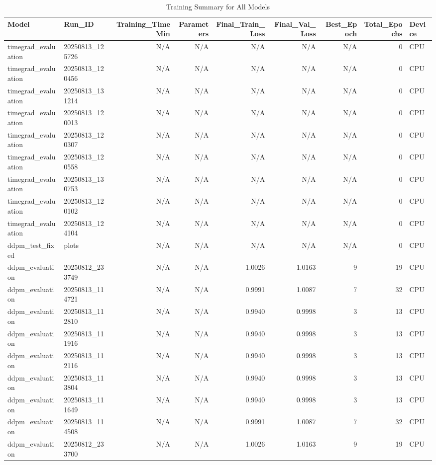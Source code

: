 \begin{table}
\caption{Training Summary for All Models}
\label{tab:training_summary}
\begin{tabular}{l|l|r|r|r|r|r|r|l}
\toprule
Model & Run_ID & Training_Time_Min & Parameters & Final_Train_Loss & Final_Val_Loss & Best_Epoch & Total_Epochs & Device \\
\midrule
timegrad_evaluation & 20250813_125726 & N/A & N/A & N/A & N/A & N/A & 0 & CPU \\
timegrad_evaluation & 20250813_120456 & N/A & N/A & N/A & N/A & N/A & 0 & CPU \\
timegrad_evaluation & 20250813_131214 & N/A & N/A & N/A & N/A & N/A & 0 & CPU \\
timegrad_evaluation & 20250813_120013 & N/A & N/A & N/A & N/A & N/A & 0 & CPU \\
timegrad_evaluation & 20250813_120307 & N/A & N/A & N/A & N/A & N/A & 0 & CPU \\
timegrad_evaluation & 20250813_120558 & N/A & N/A & N/A & N/A & N/A & 0 & CPU \\
timegrad_evaluation & 20250813_130753 & N/A & N/A & N/A & N/A & N/A & 0 & CPU \\
timegrad_evaluation & 20250813_120102 & N/A & N/A & N/A & N/A & N/A & 0 & CPU \\
timegrad_evaluation & 20250813_124104 & N/A & N/A & N/A & N/A & N/A & 0 & CPU \\
ddpm_test_fixed & plots & N/A & N/A & N/A & N/A & N/A & 0 & CPU \\
ddpm_evaluation & 20250812_233749 & N/A & N/A & 1.0026 & 1.0163 & 9 & 19 & CPU \\
ddpm_evaluation & 20250813_114721 & N/A & N/A & 0.9991 & 1.0087 & 7 & 32 & CPU \\
ddpm_evaluation & 20250813_112810 & N/A & N/A & 0.9940 & 0.9998 & 3 & 13 & CPU \\
ddpm_evaluation & 20250813_111916 & N/A & N/A & 0.9940 & 0.9998 & 3 & 13 & CPU \\
ddpm_evaluation & 20250813_112116 & N/A & N/A & 0.9940 & 0.9998 & 3 & 13 & CPU \\
ddpm_evaluation & 20250813_113804 & N/A & N/A & 0.9940 & 0.9998 & 3 & 13 & CPU \\
ddpm_evaluation & 20250813_111649 & N/A & N/A & 0.9940 & 0.9998 & 3 & 13 & CPU \\
ddpm_evaluation & 20250813_114508 & N/A & N/A & 0.9991 & 1.0087 & 7 & 32 & CPU \\
ddpm_evaluation & 20250812_233700 & N/A & N/A & 1.0026 & 1.0163 & 9 & 19 & CPU \\

\end{tabular}
\end{table}
